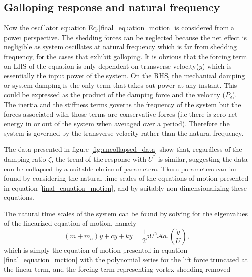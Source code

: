 \subsection{Galloping response and natural frequency}
 
 Now the oscillator equation Eq.\eqref{final_equation_motion} is considered from a power perspective. The shedding forces can be neglected because the net effect is negligible as system oscillates at natural frequency which is far from shedding frequency, for the cases that exhibit galloping. It is obvious that the forcing term on LHS of the equation is only dependent on transverse velocity($\dot{y}$) which is essentially the input power of the system. On the RHS, the mechanical damping or system damping is the only term that takes out power at any instant. This could be expressed as the product of the damping force and the velocity ($P_d$). The inertia and the stiffness terms governs the frequency of the system but the forces associated with those terms are conservative forces (i.e there is zero net energy in or out of the system when averaged over a period). Therefore the system is governed by the transverse velocity rather than the natural frequency.
 

The data presented in figure \ref{fig:uncollapsed_data} show that, regardless of the damping ratio $\zeta$, the trend of the response with $U^*$ is similar, suggesting the data can be collapsed by a suitable choice of parameters. These parameters can be found by considering the natural time scales of the equations of motion presented in equation \ref{final_equation_motion}, and by suitably non-dimensionalizing these equations.

The natural time scales of the system can be found by solving for the eigenvalues of the linearized equation of motion, namely
\begin{equation}
\label{eqn:eom_linear}
(m{+}m_a)\ddot{y}{+}c\dot{y}{+}ky{=}\frac{1}{2}\rho U^2 \mathcal{A} a_1\left(\frac{\dot{y}}{U}\right),
\end{equation}
which is simply the equation of motion presented in equation \ref{final_equation_motion} with the polynomial series for the lift force truncated at the linear term, and the forcing term representing vortex shedding removed.

